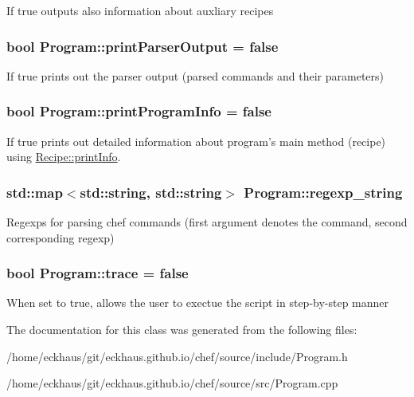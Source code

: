 If true outputs also information about auxliary recipes \hypertarget{classProgram_a3787a8712d4c75b6b5f0e81a5e4f6fdc}{
\subsubsection[{print\-Parser\-Output}]{\setlength{\rightskip}{0pt plus 5cm}bool Program\-::print\-Parser\-Output = false\hspace{0.3cm}{\ttfamily [private]}}}\label{classProgram_a3787a8712d4c75b6b5f0e81a5e4f6fdc}
If true prints out the parser output (parsed commands and their parameters) \hypertarget{classProgram_a4addd74ec821dc25e804fa2096b7fa59}{
\subsubsection[{print\-Program\-Info}]{\setlength{\rightskip}{0pt plus 5cm}bool Program\-::print\-Program\-Info = false\hspace{0.3cm}{\ttfamily [private]}}}\label{classProgram_a4addd74ec821dc25e804fa2096b7fa59}
If true prints out detailed information about program's main method (recipe) using \hyperlink{classRecipe_aa9a086810c68a0f459f3eded4fec249d}{Recipe\-::print\-Info}. \hypertarget{classProgram_a56696cc6a1e2e75f7b3abcda28fc7a8c}{
\subsubsection[{regexp\-\_\-string}]{\setlength{\rightskip}{0pt plus 5cm}std\-::map$<$std\-::string, std\-::string$>$ Program\-::regexp\-\_\-string\hspace{0.3cm}{\ttfamily [private]}}}\label{classProgram_a56696cc6a1e2e75f7b3abcda28fc7a8c}
Regexps for parsing chef commands (first argument denotes the command, second corresponding regexp) \hypertarget{classProgram_a5f4a3688d83bf77b92e294933671007c}{
\subsubsection[{trace}]{\setlength{\rightskip}{0pt plus 5cm}bool Program\-::trace = false\hspace{0.3cm}{\ttfamily [private]}}}\label{classProgram_a5f4a3688d83bf77b92e294933671007c}
When set to true, allows the user to exectue the script in step-\/by-\/step manner 

The documentation for this class was generated from the following files\-:\begin{DoxyCompactItemize}
\item 
/home/eckhaus/git/eckhaus.\-github.\-io/chef/source/include/Program.\-h\item 
/home/eckhaus/git/eckhaus.\-github.\-io/chef/source/src/Program.\-cpp\end{DoxyCompactItemize}

